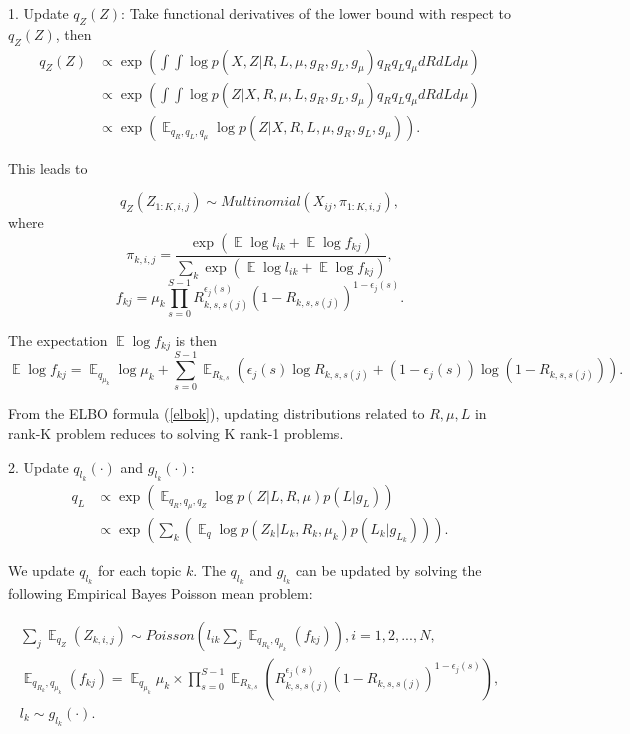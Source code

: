 \documentclass{article}
\DeclareMathOperator{\E}{\mathbb{E}}
\begin{document}
1. Update $q_Z(Z)$: Take functional derivatives of the lower bound with respect to $q_Z(Z)$, then 
\begin{equation}
    \begin{split}
        q_Z(Z) &\propto \exp (\int \int \log p(X,Z|R,L,\mu,g_R,g_L,g_\mu)q_R q_L q_\mu dR dLd\mu) 
        \\ & \propto \exp(\int\int \log p(Z|X,R,\mu,L,g_R,g_L,g_\mu)q_Rq_L q_\mu dR dLd\mu)
        \\ &\propto \exp (\E_{q_R,q_L,q_\mu}\log p(Z|X,R,L,\mu,g_R,g_L,g_\mu)).
    \end{split}
\end{equation}

This leads to 

\[q_Z(Z_{1:K,i,j})\sim Multinomial(X_{ij},\pi_{1:K,i,j}),\]
where 
\[\pi_{k,i,j} = \frac{\exp(\E\log l_{ik}+\E\log f_{kj})}{\sum_k\exp(\E\log l_{ik}+\E\log f_{kj})},\]
\[f_{kj} =  \mu_k\prod_{s=0}^{S-1} R_{k,s,s(j)}^{\epsilon_j(s)}(1-R_{k,s,s(j)})^{1-\epsilon_j(s)}.\]

The expectation $\E\log f_{kj}$ is then 
\begin{equation}
\E\log f_{kj} = \E_{q_{\mu_k}}\log\mu_k + \sum_{s=0}^{S-1}\E_{R_{k,s}}({\epsilon_j(s)}\log R_{k,s,s(j)}+(1-\epsilon_j(s))\log(1-R_{k,s,s(j)})).
\end{equation}

From the ELBO formula (\ref{elbok}), updating distributions related to $R,\mu,L$ in rank-K problem reduces to solving K rank-1 problems.

2. Update $q_{l_k}(\cdot)$ and $g_{l_k}(\cdot)$:
\begin{equation}
    \begin{split}
        q_L &\propto \exp(\E_{q_R,q_\mu,q_Z}\log p(Z|L,R,\mu)p(L|g_L))
        \\&\propto
        \exp(\sum_k(\E_q\log p(Z_k|L_k,R_k,\mu_k)p(L_k|g_{L_k}))).
    \end{split}
\end{equation}

We update $q_{l_k}$ for each topic $k$. The $q_{l_k}$ and $g_{l_k}$ can be updated by solving the following Empirical Bayes Poisson mean problem:

\begin{equation}
\begin{split}
\sum_j \E_{q_Z}(Z_{k,i,j}) \sim Poisson (l_{ik}\sum_j \E_{q_{R_k},q_{\mu_k}}(f_{kj})),  i=1,2,...,N,
\\
\E_{q_{R_k},q_{\mu_k}}(f_{kj}) = \E_{q_{\mu_k}}\mu_k \times \prod_{s=0}^{S-1}\E_{R_{k,s}}(R_{k,s,s(j)}^{\epsilon_j(s)}(1-R_{k,s,s(j)})^{1-\epsilon_j(s)}),
\\
l_{k}\sim g_{l_k}(\cdot).
\end{split}
\end{equation}
\end{document}
